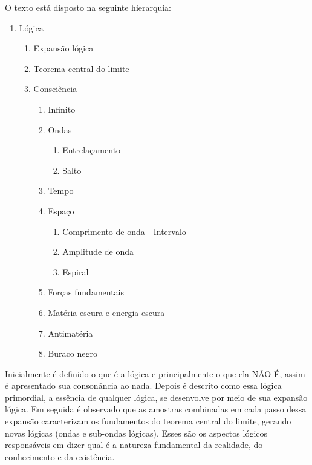 \noindent O texto está disposto na seguinte hierarquia:
	\begin{enumerate}[label*=\arabic*.]
	   \item Lógica
	   \begin{enumerate}[label*=\arabic*.]
		   \item Expansão lógica
		   \item Teorema central do limite
		   \item Consciência
			   \begin{enumerate}[label*=\arabic*.]
				   \item Infinito
				   \item Ondas 
				   \begin{enumerate}[label*=\arabic*.]
				   		\item Entrelaçamento
				   		\item Salto
				   \end{enumerate}  
				   \item Tempo
				   \item Espaço
				   \begin{enumerate}[label*=\arabic*.]
				   		\item Comprimento de onda - Intervalo
					    \item Amplitude de onda
				   		\item Espiral
				   \end{enumerate} 
				   \item Forças fundamentais
				   \item Matéria escura e energia escura
				   \item Antimatéria
				   \item Buraco negro
			   \end{enumerate}   
	   \end{enumerate}
	\end{enumerate}

Inicialmente é definido o que é a lógica e principalmente o que ela NÃO É, assim é apresentado sua consonância ao nada. Depois é descrito como essa lógica primordial, a essência de qualquer lógica, se desenvolve por meio de sua expansão lógica. Em seguida é observado que as amostras combinadas em cada passo dessa expansão caracterizam os fundamentos do teorema central do limite, gerando novas lógicas (ondas e sub-ondas lógicas). Esses são os aspectos lógicos responsáveis em dizer qual é a natureza fundamental da realidade, do conhecimento e da existência. 

\bigbreak
